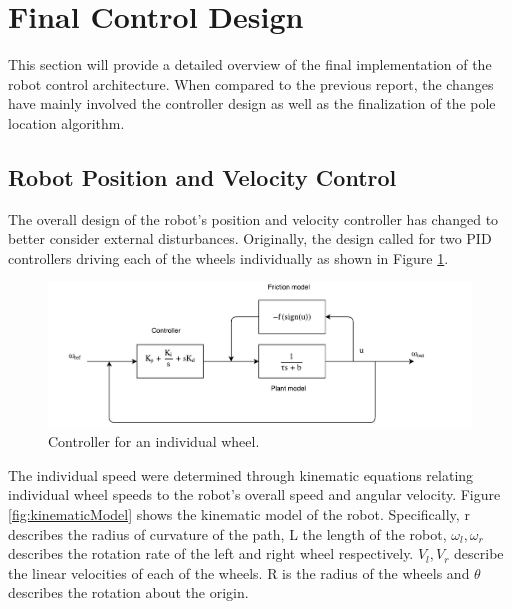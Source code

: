 \documentclass[ece]{uw-wkrpt}
\let\oldsection\section
\renewcommand\section{\clearpage\oldsection}
\begin{document}
\section{Final Control Design} \label{controls}

This section will provide a detailed overview of the final implementation of the robot control architecture. When compared to the previous report, the changes have mainly involved the controller design as well as the finalization of the pole location algorithm.

\subsection{Robot Position and Velocity Control}
The overall design of the robot's position and velocity controller has changed to better consider external disturbances. Originally, the design called for two PID controllers driving each of the wheels individually as shown in Figure \ref{fig:singleWheelController}. 

\begin{figure}
    \centering
    \includegraphics[width=5.5in]{res/380ModelForWheel}
    \caption[Controller for an individual wheel]
          {Controller for an individual wheel.}
    \label{fig:singleWheelController}
\end{figure}

The individual speed were determined through kinematic equations relating individual wheel speeds to the robot's overall speed and angular velocity. Figure \ref{fig:kinematicModel} shows the kinematic model of the robot. Specifically, r describes the radius of curvature of the path, L the length of the robot, $\omega_l, \omega_r$ describes the rotation rate of the left and right wheel respectively. $V_l, V_r$ describe the linear velocities of each of the wheels. R is the radius of the wheels and $\theta$ describes the rotation about the origin. 
\end{document}
